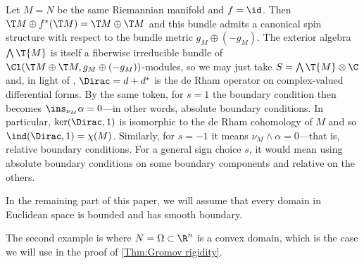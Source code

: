 \documentclass[a4paper,11pt]{amsart}
\numberwithin{equation}{section}
\begin{document}
\begin{example}\label{example:identity}
    Let \(M = N\) be the same Riemannian manifold and \(f = \id\).
    Then \(\T M \oplus f^\ast(\T M) = \T M \oplus \T M\) and this bundle admits a canonical spin structure with respect to the bundle metric \(g_M \oplus (-g_M)\).
    The exterior algebra \(\bigwedge \T{M}\) is itself a fiberwise irreducible bundle of \(\Cl(\T M \oplus \T M, g_M \oplus (-g_M))\)-modules, so we may just take \(S = \bigwedge \T{M} \otimes \C\) and, in light of , \(\Dirac = d + d^\ast\) is the de Rham operator on complex-valued differential forms.
    By the same token, for \(s = 1\) the boundary condition  then becomes \(\ins_{\nu_M} \alpha = 0\)---in other words, absolute boundary conditions.
    In particular, \(\ker(\Dirac, 1)\) is isomorphic to the de Rham cohomology of \(M\) and so \(\ind(\Dirac, 1) = \chi(M)\).
    Similarly, for \(s = -1\) it means \(\nu_M \wedge \alpha = 0\)---that is, relative boundary conditions.
    For a general sign choice \(s\), it would mean using absolute boundary conditions on some boundary components and relative on the others.    
\end{example}

\begin{convention}
In the remaining part of this paper, we will assume that every domain in Euclidean space is bounded and has smooth boundary.
\end{convention}
The second example is where \(N = \Omega \subset \R^n\) is a convex domain, which is the case we will use in the proof of \cref{Thm:Gromov rigidity}.
\end{document}

